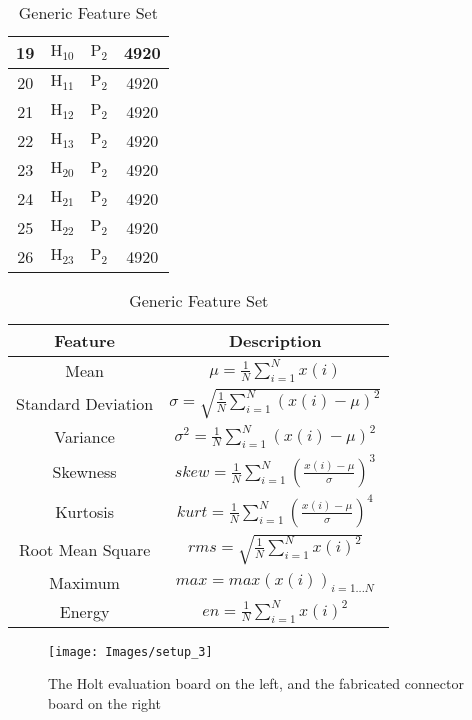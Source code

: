 \documentclass[english]{llncs}
\makeatletter
\newcommand{\enableopenany}{%
  \@openrightfalse%
}
\newcommand{\disableopenany}{%
  \@openrighttrue%
}
\newcommand{\newchapterevenpage}{%
    \enableopenany
    \chapter*{}
    \checkoddpage
    \ifoddpage
      \newpage
    \else
    \fi
    \disableopenany
  }
\makeatother
\begin{document}
\begin{table}
\begin{minipage}{0.5\textwidth}
\begin{tabular}{|c | c c c|}
      \hline
      19 & \(\text{H}_{10}\) & \(\text{P}_2\) & 4920 \\
      \hline
      20 & \(\text{H}_{11}\) & \(\text{P}_2\) & 4920 \\
      \hline
      21 & \(\text{H}_{12}\) & \(\text{P}_2\) & 4920 \\
      \hline
      22 & \(\text{H}_{13}\) & \(\text{P}_2\) & 4920 \\
      \hline
      23 & \(\text{H}_{20}\) & \(\text{P}_2\) & 4920 \\
      \hline
      24 & \(\text{H}_{21}\) & \(\text{P}_2\) & 4920 \\
      \hline
      25 & \(\text{H}_{22}\) & \(\text{P}_2\) & 4920 \\
      \hline
      26 & \(\text{H}_{23}\) & \(\text{P}_2\) & 4920 \\
      \hline
    \end{tabular}
  \end{minipage}
  \begin{minipage}{0.5\textwidth}
    \caption{Generic Feature Set}
    \label{tab:generic_feature_set}
    \centering
    \begin{tabular}{|c c|} 
      \hline
      Feature & Description \\ [0.5ex] 
      \hline\hline
      Mean & \(\mu = \frac{1}{N}\sum_{i=1}^{N}x(i)\) \\
      \hline
      Standard Deviation & \(\sigma = \sqrt{\frac{1}{N}\sum_{i=1}^{N}(x(i)-\mu)^2}\) \\
      \hline
      Variance & \(\sigma^2 = \frac{1}{N}\sum_{i=1}^{N}(x(i)-\mu)^2\) \\
      \hline
      Skewness & \(skew = \frac{1}{N} \sum_{i=1}^{N}(\frac{x(i)-\mu}{\sigma})^3\) \\
      \hline
      Kurtosis & \(kurt = \frac{1}{N} \sum_{i=1}^{N}(\frac{x(i)-\mu}{\sigma})^4\) \\
      \hline
      Root Mean Square & \(rms = \sqrt{\frac{1}{N}\sum_{i=1}^{N}x(i)^2}\) \\
      \hline
      Maximum & \(max = max(x(i))_{i=1...N}\) \\
      \hline
      Energy & \(en = \frac{1}{N}\sum_{i=1}^{N}x(i)^2\) \\
      \hline
    \end{tabular}
  \end{minipage}
  \end{table}
  
  \begin{figure}
    \centering
    \texttt{[image: Images/setup\_3]}
    \caption{The Holt evaluation board on the left, and the fabricated connector board on the right}
    \label{fig:SetupImage}
  \end{figure}
  

\iftoggle{paper}{
}{
  \pagenumbering{gobble}  %
  \pagestyle{empty}
  \newchapterevenpage
  
  \newchapterevenpage
  
  \newchapterevenpage
  
}
\end{document}
